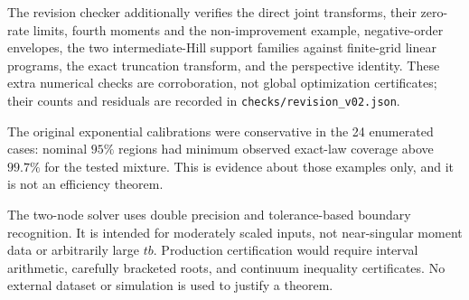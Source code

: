 \documentclass[11pt]{article}
\numberwithin{equation}{section}
\theoremstyle{definition}
\theoremstyle{remark}
\begin{document}
The revision checker additionally verifies the direct joint transforms, their zero-rate limits, fourth moments and the non-improvement example, negative-order envelopes, the two intermediate-Hill support families against finite-grid linear programs, the exact truncation transform, and the perspective identity. These extra numerical checks are corroboration, not global optimization certificates; their counts and residuals are recorded in \texttt{checks/revision\_v02.json}.

The original exponential calibrations were conservative in the 24 enumerated cases: nominal $95\%$ regions had minimum observed exact-law coverage above $99.7\%$ for the tested mixture. This is evidence about those examples only, and it is not an efficiency theorem.

The two-node solver uses double precision and tolerance-based boundary recognition. It is intended for moderately scaled inputs, not near-singular moment data or arbitrarily large $tb$. Production certification would require interval arithmetic, carefully bracketed roots, and continuum inequality certificates. No external dataset or simulation is used to justify a theorem.
\end{document}
